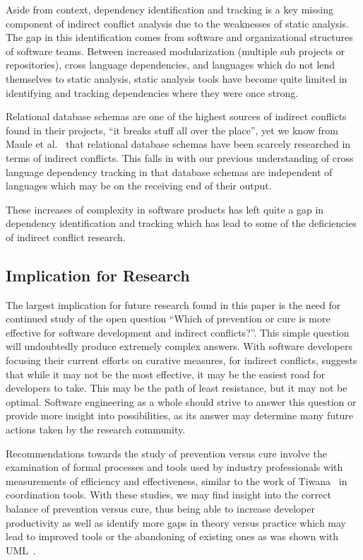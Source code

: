\documentclass[conference]{IEEEtran}
\begin{document}
Aside from context, dependency identification and tracking is a key missing component of
indirect conflict analysis due to the weaknesses of static analysis. The gap in this identification comes from software and 
organizational structures of software teams. Between increased modularization (multiple sub projects or repositories), 
cross language dependencies, and languages which do not lend themselves to static analysis, static analysis tools have 
become quite limited in identifying and tracking dependencies where they were once strong.

Relational database schemas are one of the highest sources of indirect
conflicts found in their projects, ``it breaks stuff all over the place'',
yet we know from Maule et al.~\cite{Maule:2008:IAD} that relational database schemas have 
been scarcely researched in terms of indirect conflicts. This falls in with our previous understanding of cross language
dependency tracking in that database schemas are independent of languages which may be on the receiving end of their output.

These increases of complexity in software products has left quite a gap in dependency identification and tracking which 
has lead to some of the deficiencies of indirect conflict research.


\subsection{Implication for Research}
\label{sec:implr}

The largest implication for future research found in this paper is the need for continued study of the open question
``Which of prevention or cure is more effective for software development and indirect conflicts?''. This simple question will undoubtedly 
produce extremely complex answers. With software developers focusing their current efforts on curative measures, for
indirect conflicts, suggests
that while it may not be the most effective, it may be the easiest road for developers to take. This may be the path of
least resistance, but it may not be optimal. Software engineering as a whole should strive to answer this question or
provide more insight into possibilities, as its answer may determine many future actions taken by the research community.

Recommendations towards the study of prevention versus cure involve the examination of formal processes and tools used
by industry professionals with measurements of efficiency and effectiveness, similar to the work of
Tiwana~\cite{Tiwana:2008:ICD} in coordination tools. With these studies, we may find insight into the correct balance
of prevention versus cure, thus being able to increase developer productivity as well as identify more gaps in theory 
versus practice which may lead to improved tools or the abandoning of existing ones as was shown with UML~\cite{Petre:2013:UP}.
\end{document}
